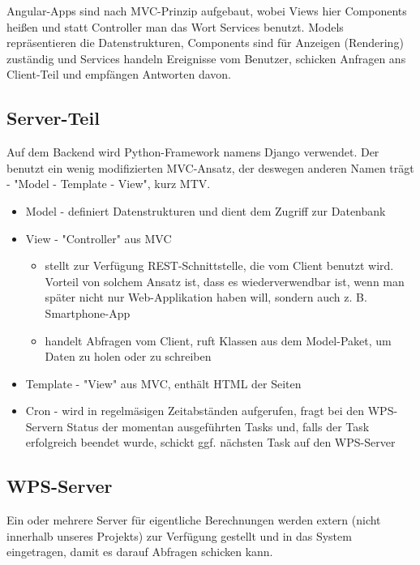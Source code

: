         Angular-Apps sind nach MVC-Prinzip aufgebaut, wobei Views hier Components heißen und statt Controller man das Wort Services benutzt. Models repräsentieren die Datenstrukturen, Components sind für Anzeigen (Rendering) zuständig und Services handeln Ereignisse vom Benutzer, schicken Anfragen ans Client-Teil und empfängen Antworten davon.
        
        \subsection{Server-Teil}
        
        Auf dem Backend wird Python-Framework namens Django verwendet. Der benutzt ein wenig modifizierten MVC-Ansatz, der deswegen anderen Namen trägt - "Model - Template - View", kurz MTV.
        
        \begin{itemize}
            \item Model - definiert Datenstrukturen und dient dem Zugriff zur Datenbank
            \item View - "Controller" aus MVC 
            
            \begin{itemize}
                \item stellt zur Verfügung REST-Schnittstelle, die vom Client benutzt wird. Vorteil von solchem Ansatz ist, dass es wiederverwendbar ist, wenn man später nicht nur Web-Applikation haben will, sondern auch z. B. Smartphone-App
                \item handelt Abfragen vom Client, ruft Klassen aus dem Model-Paket, um Daten zu holen oder zu schreiben
            \end{itemize}
            \item Template - "View" aus MVC, enthält HTML der Seiten 
            \item Cron - wird in regelmäsigen Zeitabständen aufgerufen, fragt bei den WPS-Servern Status der momentan ausgeführten Tasks und, falls der Task erfolgreich beendet wurde, schickt ggf. nächsten Task auf den WPS-Server
        \end{itemize}
        
        \subsection{WPS-Server}
        
        Ein oder mehrere Server für eigentliche Berechnungen werden extern (nicht innerhalb unseres Projekts) zur Verfügung gestellt und in das System eingetragen, damit es darauf Abfragen schicken kann.
    